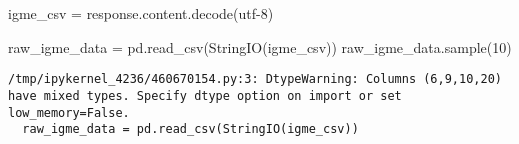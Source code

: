 \documentclass[
  letterpaper,
  DIV=11,
  numbers=noendperiod]{scrreprt}
\newenvironment{Shaded}{\begin{snugshade}}{\end{snugshade}}
\newcommand{\DecValTok}[1]{\textcolor[rgb]{0.68,0.00,0.00}{#1}}
\newcommand{\NormalTok}[1]{\textcolor[rgb]{0.00,0.23,0.31}{#1}}
\newcommand{\OperatorTok}[1]{\textcolor[rgb]{0.37,0.37,0.37}{#1}}
\newcommand{\StringTok}[1]{\textcolor[rgb]{0.13,0.47,0.30}{#1}}
\begin{document}
\begin{Shaded}
\begin{Highlighting}[]
\NormalTok{igme\_csv }\OperatorTok{=}\NormalTok{ response.content.decode(}\StringTok{\textquotesingle{}utf{-}8\textquotesingle{}}\NormalTok{)}

\NormalTok{raw\_igme\_data }\OperatorTok{=}\NormalTok{ pd.read\_csv(StringIO(igme\_csv))}
\NormalTok{raw\_igme\_data.sample(}\DecValTok{10}\NormalTok{)}
\end{Highlighting}
\end{Shaded}

\begin{verbatim}
/tmp/ipykernel_4236/460670154.py:3: DtypeWarning: Columns (6,9,10,20) have mixed types. Specify dtype option on import or set low_memory=False.
  raw_igme_data = pd.read_csv(StringIO(igme_csv))
\end{verbatim}
\end{document}
